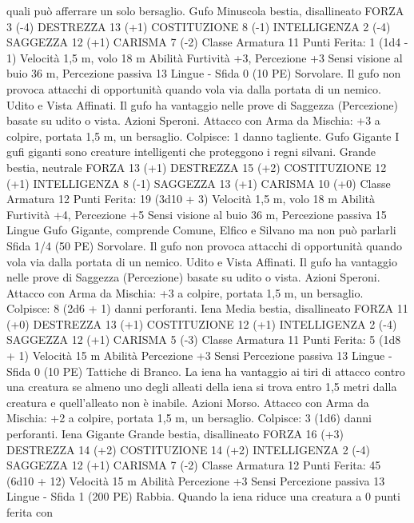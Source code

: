 \begin{multicols}{2}
quali può afferrare un solo bersaglio.
Gufo
Minuscola bestia, disallineato
FORZA 3 (-4)
DESTREZZA 13 (+1)
COSTITUZIONE 8 (-1)
INTELLIGENZA 2 (-4)
SAGGEZZA 12 (+1)
CARISMA 7 (-2)
Classe Armatura 11
\hspace*{0pt}\hfill{Punti Ferita}: 1 (1d4 - 1)
Velocità 1,5 m, volo 18 m
Abilità Furtività +3, Percezione +3
Sensi visione al buio 36 m, Percezione passiva 13
Lingue -
Sfida 0 (10 PE)
Sorvolare. Il gufo non provoca attacchi di opportunità quando
vola via dalla portata di un nemico.
Udito e Vista Affinati. Il gufo ha vantaggio nelle prove di
Saggezza (Percezione) basate su udito o vista.
Azioni
Speroni. Attacco con Arma da Mischia: +3 a colpire, portata 1,5
m, un bersaglio.
Colpisce: 1 danno tagliente.
Gufo Gigante
I gufi giganti sono creature intelligenti che proteggono i
regni silvani.
Grande bestia, neutrale
FORZA 13 (+1)
DESTREZZA 15 (+2)
COSTITUZIONE 12 (+1)
INTELLIGENZA 8 (-1)
SAGGEZZA 13 (+1)
CARISMA 10 (+0)
Classe Armatura 12
\hspace*{0pt}\hfill{Punti Ferita}: 19 (3d10 + 3)
Velocità 1,5 m, volo 18 m
Abilità Furtività +4, Percezione +5
Sensi visione al buio 36 m, Percezione passiva 15
Lingue Gufo Gigante, comprende Comune, Elfico e Silvano ma
non può parlarli
Sfida 1/4 (50 PE)
Sorvolare. Il gufo non provoca attacchi di opportunità quando
vola via dalla portata di un nemico.
Udito e Vista Affinati. Il gufo ha vantaggio nelle prove di
Saggezza (Percezione) basate su udito o vista.
Azioni
Speroni. Attacco con Arma da Mischia: +3 a colpire, portata 1,5
m, un bersaglio.
Colpisce: 8 (2d6 + 1) danni perforanti.
Iena
Media bestia, disallineato
FORZA 11 (+0)
DESTREZZA 13 (+1)
COSTITUZIONE 12 (+1)
INTELLIGENZA 2 (-4)
SAGGEZZA 12 (+1)
CARISMA 5 (-3)
Classe Armatura 11
\hspace*{0pt}\hfill{Punti Ferita}: 5 (1d8 + 1)
Velocità 15 m
Abilità Percezione +3
Sensi Percezione passiva 13
Lingue -
Sfida 0 (10 PE)
Tattiche di Branco. La iena ha vantaggio ai tiri di attacco contro
una creatura se almeno uno degli alleati della iena si trova entro
1,5 metri dalla creatura e quell’alleato non è inabile.
Azioni
Morso. Attacco con Arma da Mischia: +2 a colpire, portata 1,5
m, un bersaglio.
Colpisce: 3 (1d6) danni perforanti.
Iena Gigante
Grande bestia, disallineato
FORZA 16 (+3)
DESTREZZA 14 (+2)
COSTITUZIONE 14 (+2)
INTELLIGENZA 2 (-4)
SAGGEZZA 12 (+1)
CARISMA 7 (-2)
Classe Armatura 12
\hspace*{0pt}\hfill{Punti Ferita}: 45 (6d10 + 12)
Velocità 15 m
Abilità Percezione +3
Sensi Percezione passiva 13
Lingue -
Sfida 1 (200 PE)
Rabbia. Quando la iena riduce una creatura a 0 punti ferita con

\end{multicols}
